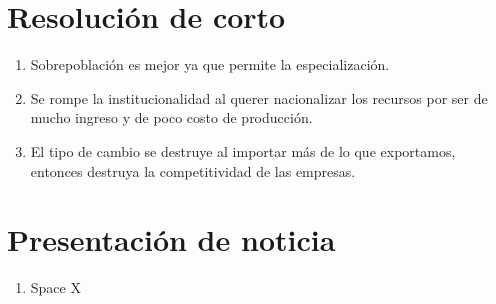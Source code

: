\section{Resolución de corto}
\begin{enumerate}
    \item Sobrepoblación es mejor ya que permite la especialización.
    \item Se rompe la institucionalidad al querer nacionalizar los recursos por ser de mucho ingreso y de poco costo de producción.
    \item El tipo de cambio se destruye al importar más de lo que exportamos, entonces destruya la competitividad de las empresas.
\end{enumerate}

\section{Presentación de noticia}
\begin{enumerate}
    \item Space X 
\end{enumerate}


